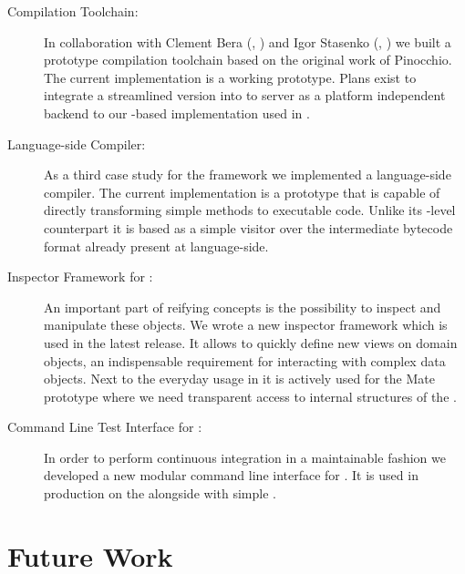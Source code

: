 \begin{description}
	\item[\VirtualCPU Compilation Toolchain:]
		In collaboration with Clement Bera (\RMoD, \INRIA) and Igor Stasenko (\RMoD, \INRIA) we built a prototype compilation toolchain based on the original work of Pinocchio.
		The current implementation is a working prototype.
		Plans exist to integrate a streamlined version into \PH to server as a platform independent backend to our \B-based \FFI implementation used in \PH.

	\item[\NBJ Language-side \JIT Compiler:]
		As a third case study for the \B framework we implemented a language-side \JIT compiler. 
		The current implementation is a prototype that is capable of directly transforming simple methods to executable code.
		Unlike its \VM-level counterpart it is based as a simple visitor over the intermediate bytecode format already present at language-side.

	\item[Inspector Framework for \PH:] 
		An important part of reifying concepts is the possibility to inspect and manipulate these objects.
		We wrote a new inspector framework which is used in the latest \PH release.
		It allows to quickly define new views on domain objects, an indispensable requirement for interacting with complex data objects.
		Next to the everyday usage in \PH it is actively used for the Mate \VM prototype where we need transparent access to internal structures of the \VM.

	\item[Command Line Test Interface for \PH:]
		In order to perform continuous integration in a maintainable fashion we developed a new modular command line interface for \PH. 
		It is used in production on the  alongside with simple .
\end{description}


\section{Future Work}
 \\
 \\
 \\


